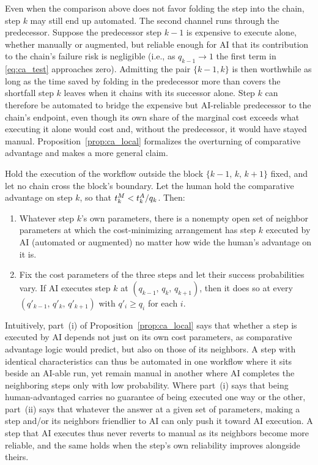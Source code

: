 Even when the comparison above does not favor folding the step into the chain, step $k$ may still end up automated.
The second channel runs through the predecessor.
Suppose the predecessor step $k-1$ is expensive to execute alone, whether manually or augmented, but reliable enough for AI that its contribution to the chain's failure risk is negligible (i.e., as $q_{k-1} \to 1$ the first term in \eqref{eq:ca_test} approaches zero).
Admitting the pair $\{k-1, k\}$ is then worthwhile as long as the time saved by folding in the predecessor more than covers the shortfall step $k$ leaves when it chains with its successor alone.
Step $k$ can therefore be automated to bridge the expensive but AI-reliable predecessor to the chain's endpoint, even though its own share of the marginal cost exceeds what executing it alone would cost and, without the predecessor, it would have stayed manual.
Proposition~\ref{prop:ca_local} formalizes the overturning of comparative advantage and makes a more general claim.

\begin{proposition}
\label{prop:ca_local}
Hold the execution of the workflow outside the block $\{k-1,\, k,\, k+1\}$ fixed, and let no chain cross the block's boundary.
Let the human hold the comparative advantage on step $k$, so that $t^{M}_{k} < t^{A}_{k}/q_k$.
Then:
\begin{enumerate}
\item[(i)] Whatever step $k$'s own parameters, there is a nonempty open set of neighbor parameters at which the cost-minimizing arrangement has step $k$ executed by AI (automated or augmented) no matter how wide the human's advantage on it is.
\item[(ii)] Fix the cost parameters of the three steps and let their success probabilities vary. If AI executes step $k$ at $(q_{k-1},\, q_k,\, q_{k+1})$, then it does so at every $(q'_{k-1},\, q'_k,\, q'_{k+1})$ with $q'_i \geq q_i$ for each $i$.
\end{enumerate}
\end{proposition}

Intuitively, part~(i) of Proposition~\ref{prop:ca_local} says that whether a step is executed by AI depends not just on its own cost parameters, as comparative advantage logic would predict, but also on those of its neighbors.
A step with identical characteristics can thus be automated in one workflow where it sits beside an AI-able run, yet remain manual in another where AI completes the neighboring steps only with low probability.
Where part~(i) says that being human-advantaged carries no guarantee of being executed one way or the other, part~(ii) says that whatever the answer at a given set of parameters, making a step and/or its neighbors friendlier to AI can only push it toward AI execution.
A step that AI executes thus never reverts to manual as its neighbors become more reliable, and the same holds when the step's own reliability improves alongside theirs.


